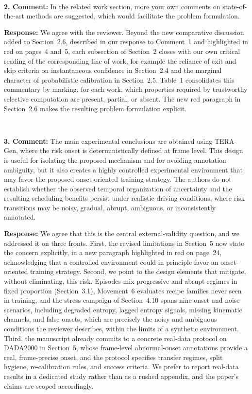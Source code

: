 \documentclass[1p,12pt,authoryear]{elsarticle}
\begin{document}
~

\noindent \textbf{2. Comment:} In the related work section, more your own comments on state-of-the-art methods are suggested, which would facilitate the problem formulation.

\vspace{2mm}
\noindent \textbf{Response:} We agree with the reviewer. Beyond the new comparative discussion added to Section~2.6, described in our response to Comment~1 and highlighted in red on pages~4 and~5, each subsection of Section~2 closes with our own critical reading of the corresponding line of work, for example the reliance of exit and skip criteria on instantaneous confidence in Section~2.4 and the marginal character of probabilistic calibration in Section~2.5. Table~1 consolidates this commentary by marking, for each work, which properties required by trustworthy selective computation are present, partial, or absent. The new red paragraph in Section~2.6 makes the resulting problem formulation explicit.

~

\noindent \textbf{3. Comment:} The main experimental conclusions are obtained using TERA-Gen, where the risk onset is deterministically defined at frame level. This design is useful for isolating the proposed mechanism and for avoiding annotation ambiguity, but it also creates a highly controlled experimental environment that may favor the proposed onset-oriented training strategy. The authors do not establish whether the observed temporal organization of uncertainty and the resulting scheduling benefits persist under realistic driving conditions, where risk transitions may be noisy, gradual, abrupt, ambiguous, or inconsistently annotated.

\vspace{2mm}
\noindent \textbf{Response:} We agree that this is the central external-validity question, and we addressed it on three fronts. First, the revised limitations in Section~5 now state the concern explicitly, in a new paragraph highlighted in red on page~24, acknowledging that a controlled environment could in principle favor an onset-oriented training strategy. Second, we point to the design elements that mitigate, without eliminating, this risk. Episodes mix progressive and abrupt regimes in fixed proportion (Section~3.1), Movement~6 evaluates recipe families never seen in training, and the stress campaign of Section~4.10 spans nine onset and noise scenarios, including degraded entropy, lagged entropy signals, missing kinematic channels, and false onsets, which are precisely the noisy and ambiguous conditions the reviewer describes, within the limits of a synthetic environment. Third, the manuscript already commits to a concrete real-data protocol on DADA2000 in Section~5, whose frame-level abnormal-onset annotations provide a real, frame-precise onset, and the protocol specifies transfer regimes, split hygiene, re-calibration rules, and success criteria. We prefer to report real-data results in a dedicated study rather than as a rushed appendix, and the paper's claims are scoped accordingly.
\end{document}
